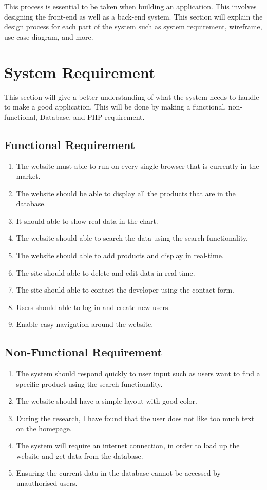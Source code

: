 This process is essential to be taken when building an application. This involves designing the front-end as well as a back-end system. This section will explain the design process for each part of the system such as system requirement, wireframe, use case diagram, and more.

\section{System Requirement}
This section will give a better understanding of what the system needs to handle to make a good application. This will be done by making a functional, non-functional, Database, and PHP requirement.

\subsection{Functional Requirement}
\begin{enumerate}
    \item The website must able to run on every single browser that is currently in the market.
    \item The website should be able to display all the products that are in the database.
    \item It should able to show real data in the chart.
    \item The website should able to search the data using the search functionality.
    \item The website should able to add products and display in real-time.
    \item The site should able to delete and edit data in real-time.
    \item The site should able to contact the developer using the contact form.
    \item Users should able to log in and create new users.
    \item Enable easy navigation around the website.
\end{enumerate}

\subsection{Non-Functional Requirement}
\begin{enumerate}
    \item The system should respond quickly to user input such as users want to find a specific product using the search functionality.
    \item The website should have a simple layout with good color.
    \item During the research, I have found that the user does not like too much text on the homepage.
    \item The system will require an internet connection, in order to load up the website and get data from the database.
    \item Ensuring the current data in the database cannot be accessed by unauthorised users.
\end{enumerate}

